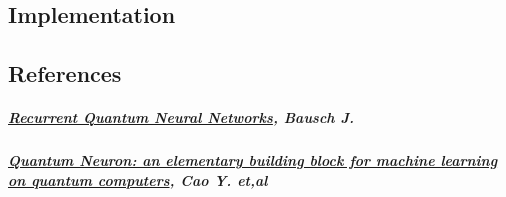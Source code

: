 \hypertarget{implementation}{%
\subsection{Implementation}\label{implementation}}

\hypertarget{references}{%
\subsection{References}\label{references}}

\hypertarget{recurrent-quantum-neural-networks-bausch-j.}{%
\subparagraph{\texorpdfstring{\href{./references/2006.14619.pdf}{Recurrent
Quantum Neural Networks}, Bausch
J.}{Recurrent Quantum Neural Networks, Bausch J.}}\label{recurrent-quantum-neural-networks-bausch-j.}}

\hypertarget{quantum-neuron-an-elementary-building-block-for-machine-learning-on-quantum-computers-cao-y.-etal}{%
\subparagraph{\texorpdfstring{\href{./references/1711.11240.pdf}{Quantum
Neuron: an elementary building block for machine learning on quantum
computers}, Cao Y.
et,al}{Quantum Neuron: an elementary building block for machine learning on quantum computers, Cao Y. et,al}}\label{quantum-neuron-an-elementary-building-block-for-machine-learning-on-quantum-computers-cao-y.-etal}}
